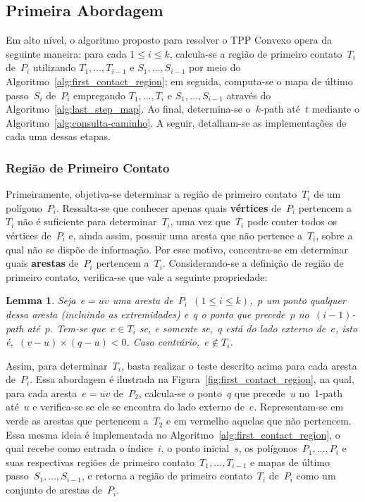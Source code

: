\documentclass[11pt]{article}
\newcommand{\algref}[1]{\ref{#1}}
\newtheorem{lemma}[theorem]{Lemma}
\newenvironment{blockQuote}[1][lightgray]{\begin{mdframed}[
	leftline=true,
	topline=false,
	bottomline=false,
	rightline=false,
	linecolor=gray,
	linewidth=2pt,
	backgroundcolor=#1,
	skipabove=\baselineskip,
	skipbelow=\baselineskip,
	innerleftmargin=10pt,
	innerrightmargin=10pt,
	innertopmargin=5pt,
	innerbottommargin=5pt]
}
{\end{mdframed}}
\begin{document}
\subsection{Primeira Abordagem}

Em alto nível, o algoritmo proposto para resolver o TPP Convexo opera da seguinte maneira: para cada \(1 \le i \le k\), calcula-se a região de primeiro contato~\(T_i\) de~\(P_i\) utilizando \(T_1, \dots, T_{i - 1}\) e \(S_1, \dots, S_{i - 1}\) por meio do Algoritmo~\algref{alg:first_contact_region}; em seguida, computa-se o mapa de último passo~\(S_i\) de~\(P_i\) empregando \(T_1, \dots, T_i\) e \(S_1, \dots, S_{i - 1}\) através do Algoritmo~\algref{alg:last_step_map}. Ao final, determina-se o~\(k\)-path até~\(t\) mediante o Algoritmo~\algref{alg:consulta-caminho}. A seguir, detalham-se as implementações de cada uma dessas etapas.

\subsubsection{Região de Primeiro Contato}

Primeiramente, objetiva-se determinar a região de primeiro contato~\(T_i\) de um polígono~\(P_i\). Ressalta-se que conhecer apenas quais \textbf{vértices} de~\(P_i\) pertencem a~\(T_i\) não é suficiente para determinar~\(T_i\), uma vez que~\(T_i\) pode conter todos os vértices de~\(P_i\) e, ainda assim, possuir uma aresta que não pertence a~\(T_i\), sobre a qual não se dispõe de informação. Por esse motivo, concentra-se em determinar quais \textbf{arestas} de~\(P_i\) pertencem a~\(T_i\). Considerando-se a definição de região de primeiro contato, verifica-se que vale a seguinte propriedade:

\begin{blockQuote}
\begin{lemma}
	Seja~\(e = \overline{uv}\) uma aresta de~\(P_i\)~\((1 \le i \le k)\),~\(p\) um ponto qualquer dessa aresta (incluindo as extremidades) e~\(q\) o ponto que precede~\(p\) no~\((i - 1)\)-path até~\(p\). Tem-se que~\(e \in T_i\) se, e somente se,~\(q\) está do lado externo de~\(e\), isto é,~\((v - u) \times (q - u) < 0\). Caso contrário,~\(e \notin T_i\). \label{lemma:2.1}
\end{lemma}
\vspace{-1em}
\end{blockQuote}

Assim, para determinar~\(T_i\), basta realizar o teste descrito acima para cada aresta de~\(P_i\). Essa abordagem é ilustrada na Figura~\ref{fig:first_contact_region}, na qual, para cada aresta~\(e = \overline{uv}\) de~\(P_2\), calcula-se o ponto~\(q\) que precede~\(u\) no~1-path até~\(u\) e verifica-se se ele se encontra do lado externo de~\(e\). Representam-se em verde as arestas que pertencem a~\(T_2\) e em vermelho aquelas que não pertencem. Essa mesma ideia é implementada no Algoritmo~\algref{alg:first_contact_region}, o qual recebe como entrada o índice~\(i\), o ponto inicial~\(s\), os polígonos~\(P_1, \dots, P_i\) e suas respectivas regiões de primeiro contato~\(T_1, \dots, T_{i - 1}\) e mapas de último passo~\(S_1, \dots, S_{i - 1}\), e retorna a região de primeiro contato~\(T_i\) de~\(P_i\) como um conjunto de arestas de~\(P_i\).
\end{document}
